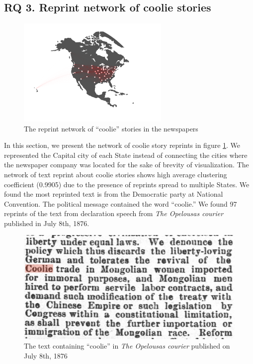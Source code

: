 \documentclass[11pt]{article}
\begin{document}
\subsection{RQ 3. Reprint network of coolie stories} \label{sec:result_rq3_reprint}

\begin{figure}[h!]
  \centering
  \includegraphics[width=0.65\textwidth]{reprintviz1.pdf}
  \caption{The reprint network of ``coolie'' stories in the newspapers}
  \label{fig:reprint}
\end{figure}

In this section, we present the network of coolie story reprints in figure \ref{fig:reprint}. 
We represented the Capital city of each State instead of connecting the cities where the newspaper company was located 
for the sake of brevity of visualization.
The network of text reprint about coolie stories shows 
high average clustering coefficient (0.9905) \cite{saramaki2007generalizations} due to 
the presence of reprints spread to multiple States.
We found the most reprinted text is from the Democratic party
at National Convention. The political message contained the 
word ``coolie.'' We found 97 reprints of the text from declaration
speech from \textit{The Opelousas courier} published in July 8th, 1876.

\begin{figure}[h!]
  \centering
  \includegraphics[width=\columnwidth]{excerpt1.png}
  \caption{The text containing ``coolie'' in \textit{The Opelousas courier} published on July 8th, 1876}
  \label{fig:excerpt1}
\end{figure}
\end{document}
